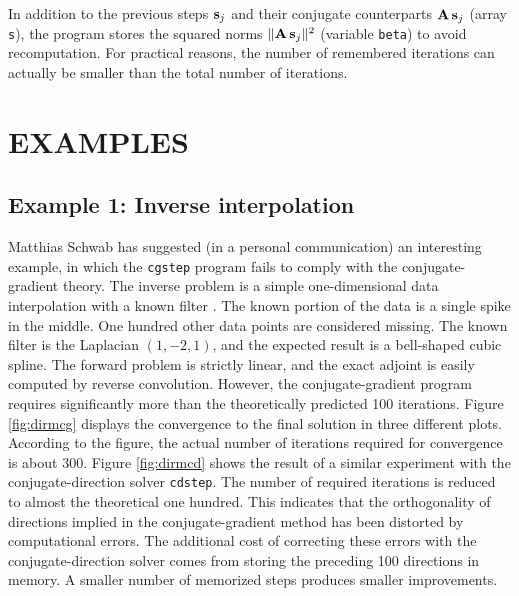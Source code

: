 In addition to the previous steps ${\bf s}_j$ and their conjugate
counterparts ${\bf A\,s}_j$ (array \verb!s!), the program stores the
squared norms $\|{\bf A\,s}_j\|^2$ (variable \verb!beta!) to avoid
recomputation.  For practical reasons, the number of remembered
iterations can actually be smaller than the total number of
iterations.


\section{EXAMPLES}

\subsection{Example 1: Inverse interpolation}


Matthias Schwab has suggested (in a personal communication) an
interesting example, in which the \verb!cgstep! program fails to
comply with the conjugate-gradient theory. The inverse problem is a
simple one-dimensional data interpolation with a known filter
\cite[]{gee}. The known portion of the data is a single
spike in the middle. One hundred other data points are considered
missing. The known filter is the Laplacian $(1,-2,1)$, and the
expected result is a bell-shaped cubic spline. The forward problem is
strictly linear, and the exact adjoint is easily computed by reverse
convolution. However, the conjugate-gradient program requires
significantly more than the theoretically predicted 100
iterations. Figure \ref{fig:dirmcg} displays the convergence to the
final solution in three different plots. According to the figure, the
actual number of iterations required for convergence is about
300. Figure \ref{fig:dirmcd} shows the result of a similar experiment
with the conjugate-direction solver \verb!cdstep!. The number of
required iterations is reduced to almost the theoretical one
hundred. This indicates that the orthogonality of directions implied
in the conjugate-gradient method has been distorted by computational
errors. The additional cost of correcting these errors with the
conjugate-direction solver comes from storing the preceding 100
directions in memory. A smaller number of memorized steps produces
smaller improvements.

